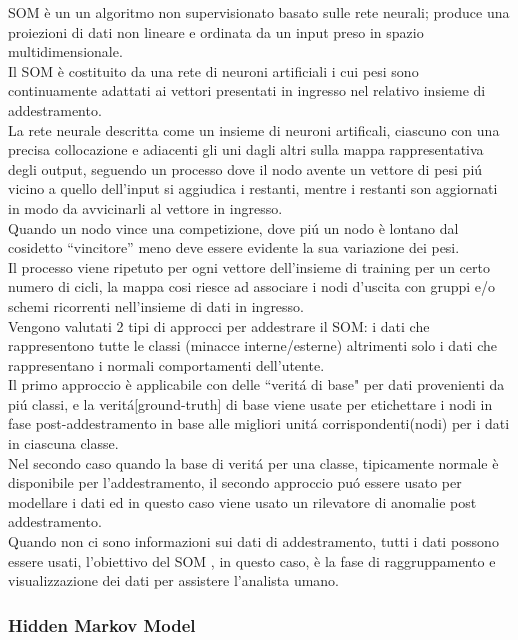 \documentclass[../tesi.tex]{subfiles}
\begin{document}
SOM è un un algoritmo non supervisionato basato sulle rete neurali; produce una proiezioni di dati non lineare e ordinata da un input preso in spazio multidimensionale.\\
Il SOM è costituito da una rete di neuroni artificiali i cui pesi sono continuamente adattati ai vettori presentati in ingresso nel relativo insieme di addestramento.\\
La rete neurale descritta come un insieme di neuroni artificali, ciascuno con una precisa collocazione e adiacenti gli uni dagli altri sulla mappa rappresentativa degli output, seguendo un processo dove il nodo avente un vettore di pesi piú vicino a quello dell’input si aggiudica i restanti, mentre i restanti son aggiornati in modo da avvicinarli al vettore in ingresso.\\
Quando un nodo vince una competizione, dove piú un nodo è lontano dal cosidetto “vincitore” meno deve essere evidente la sua variazione dei pesi.\\
Il processo viene ripetuto per ogni vettore dell’insieme di training per un certo numero di cicli, la mappa cosi riesce ad associare i nodi d’uscita con gruppi e/o schemi ricorrenti nell’insieme di dati in ingresso.\\
Vengono valutati 2 tipi di approcci per addestrare il SOM: i dati che rappresentono tutte le classi (minacce interne/esterne) altrimenti solo i dati che rappresentano i normali comportamenti dell’utente.\\
Il primo approccio è applicabile con delle ``veritá di base" per dati provenienti da piú classi, e la veritá[ground-truth] di base viene usate per etichettare i nodi in fase post-addestramento in base alle migliori unitá corrispondenti(nodi) per i dati in ciascuna classe.\\
Nel secondo caso quando la base di veritá per una classe, tipicamente normale è disponibile per l’addestramento, il secondo approccio puó essere usato per modellare i dati ed in questo caso viene usato un rilevatore di anomalie post addestramento.\\
Quando non ci sono informazioni sui dati di addestramento, tutti i dati possono essere usati, l’obiettivo del SOM , in questo caso, è la fase di raggruppamento e visualizzazione dei dati per assistere l’analista umano.

\subsubsection{Hidden Markov Model}
\end{document}
